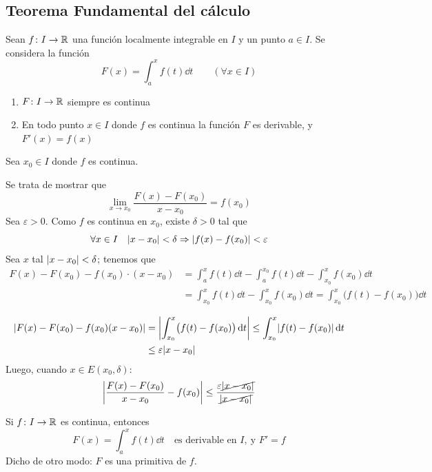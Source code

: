\documentclass[11pt,a4paper]{article}
\begin{document}
\subsection{Teorema Fundamental del cálculo}

\begin{teorema}
  Sean $f\colon I\to\R$ una función localmente integrable en $I$ y un
  punto $a\in I$. Se considera la función
  \[
    F(x)=\int_a^x f(t)\dd t\qquad(\forall x\in I)
  \]
  \begin{enumerate}[label=(\arabic*)]
    \item $F\colon I\to\R$ siempre es continua
    \item En todo punto $x\in I$ donde $f$ es continua la función $F$ es
      derivable, y $F'(x)=f(x)$
  \end{enumerate}
\end{teorema}


\begin{demo}[Demostración de (2)]
  Sea $x_0\in I$ donde $f$ es continua.

  Se trata de mostrar que
  \[
    \lim_{x\to x_0}\frac{F(x)-F(x_0)}{x-x_0}=f(x_0)
  \]
  Sea $\varepsilon>0$. Como $f$ es continua en $x_0$, existe $\delta>0$
  tal que
  \[
    \forall x\in I\quad\abs{x-x_0}<\delta\Rightarrow
    \abs{f(x)-f(x_0)}<\varepsilon
  \]
  Sea $x$ tal $\abs{x-x_0}<\delta$; tenemos que
  \begin{align*}
    F(x)-F(x_0)-f(x_0)\cdot(x-x_0)
    &=\int_a^x f(t)\dd t-\int_a^{x_0}f(t)\dd t-\int_{x_0}^x f(x_0)\dd t\\
    &=\int_{x_0}^x f(t)\dd t-\int_{x_0}^x f(x_0)\dd t
     =\int_{x_0}^x\bigl(f(t)-f(x_0)\bigr)\dd t
  \end{align*}

  \begin{align*}
    \abs{F(x)-F(x_0)-f(x_0)(x-x_0)}
    &=\abs*{\int_{x_0}^x\bigl(f(t)-f(x_0)\bigr)\dd t}
     \leq\int_{x_0}^x\abs{f(t)-f(x_0)}\dd t\\
    &\leq\varepsilon\abs{x-x_0}
  \end{align*}
  Luego, cuando $x\in E(x_0,\delta)$:
  \[
    \abs*{\frac{F(x)-F(x_0)}{x-x_0}-f(x_0)}
    \leq\frac{\varepsilon\cancel{\abs{x-x_0}}}{\cancel{\abs{x-x_0}}}
  \]
\end{demo}

\begin{corolario}
  Si $f\colon I\to\R$ es continua, entonces
  \[
    F(x)=\int_a^x f(t)\dd t\quad\text{es derivable en } I,\ \text{y } F'=f
  \]
  Dicho de otro modo: $F$ es una primitiva de $f$.
\end{corolario}
\end{document}
